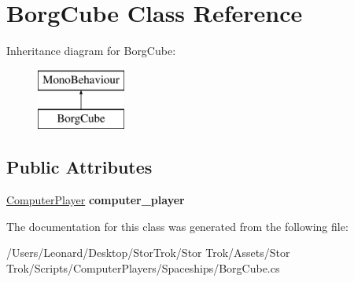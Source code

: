 \hypertarget{class_borg_cube}{}\section{Borg\+Cube Class Reference}
\label{class_borg_cube}
Inheritance diagram for Borg\+Cube\+:\begin{figure}[H]
\begin{center}
\leavevmode
\includegraphics[height=2.000000cm]{class_borg_cube}
\end{center}
\end{figure}
\subsection*{Public Attributes}
\begin{DoxyCompactItemize}
\item 
\mbox{\label{class_borg_cube_ab24a0396db035b845d9a2ed2c22fd62d}} 
\hyperlink{class_computer_player}{Computer\+Player} {\bfseries computer\+\_\+player}
\end{DoxyCompactItemize}


The documentation for this class was generated from the following file\+:\begin{DoxyCompactItemize}
\item 
/\+Users/\+Leonard/\+Desktop/\+Stor\+Trok/\+Stor Trok/\+Assets/\+Stor Trok/\+Scripts/\+Computer\+Players/\+Spaceships/Borg\+Cube.\+cs\end{DoxyCompactItemize}
